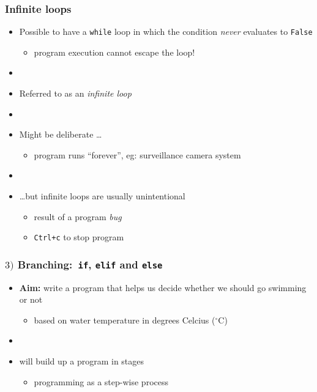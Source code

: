 \documentclass[english,14pt]{beamer}
\newcommand\red[1]{{\color{red} #1}}
\begin{document}
\begin{frame}[fragile]

\frametitle{Infinite loops}

\begin{itemize}
	\item Possible to have a \texttt{while} loop in which the condition \emph{never} evaluates to \texttt{False}
	\begin{itemize}
		\item program execution cannot escape the loop!
	\end{itemize}
	
	\item[]
	
	\item Referred to as an \red{\emph{infinite loop}}
	
	\item[]
	
	\item Might be deliberate \ldots
	\begin{itemize}
		\item program runs ``forever'', eg: surveillance camera system
	\end{itemize}
	
	\item[]
	\item \ldots but infinite loops are usually unintentional
	\begin{itemize}
		\item result of a program \red{\emph{bug}}
		\item \texttt{Ctrl+c} to stop program
	\end{itemize}
	
\end{itemize}

\end{frame}


\begin{frame}[fragile]

\frametitle{$3)$ Branching:~\texttt{if}, \texttt{elif} and \texttt{else}}

\begin{itemize}
	\item[] \textbf{Aim:} write a program that helps us decide whether we should go swimming or not
	\begin{itemize}
		\item based on water temperature in degrees Celcius ($^\circ$C)
	\end{itemize}
	\item[]
	\item will build up a program in stages
	\begin{itemize}
		\item programming as a step-wise process
	\end{itemize}
\end{itemize}

\end{frame}
\end{document}
